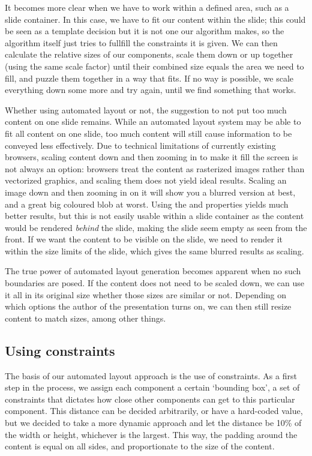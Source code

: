    It becomes more clear when we have to work within a defined area, such as a
   slide container. In this case, we have to fit our content within the slide;
   this could be seen as a template decision but it is not one our algorithm
   makes, so the algorithm itself just tries to fullfill the constraints it is
   given. We can then calculate the relative sizes of our components, scale
   them down or up together (using the same scale factor) until their combined
   size equals the area we need to fill, and puzzle them together in a way that
   fits. If no way is possible, we scale everything down some more and try
   again, until we find something that works.

   Whether using automated layout or not, the suggestion to not put too much
   content on one slide remains. While an automated layout system may be able
   to fit all content on one slide, too much content will still cause
   information to be conveyed less effectively. Due to technical limitations of
   currently existing browsers, scaling content down and then zooming in to
   make it fill the screen is not always an option: browsers treat the content
   as rasterized images rather than vectorized graphics, and scaling them does
   not yield ideal results. Scaling an image down and then zooming in on it
   will show you a blurred version at best, and a great big coloured blob at
   worst. Using the  and  properties
   yields much better results, but this is not easily usable within a slide
   container as the content would be rendered \emph{behind} the slide, making
   the slide seem empty as seen from the front. If we want the content to be
   visible on the slide, we need to render it within the size limits of the
   slide, which gives the same blurred results as scaling.

   The true power of automated layout generation becomes apparent when no such
   boundaries are posed. If the content does not need to be scaled down, we can
   use it all in its original size whether those sizes are similar or not.
   Depending on which options the author of the presentation turns on, we can
   then still resize content to match sizes, among other things.

   \subsection{Using constraints}

    The basis of our automated layout approach is the use of constraints. As a
    first step in the process, we assign each component a certain `bounding
    box', a set of constraints that dictates how close other components can get
    to this particular component. This distance can be decided arbitrarily, or
    have a hard-coded value, but we decided to take a more dynamic approach and
    let the distance be 10\% of the width or height, whichever is the largest.
    This way, the padding around the content is equal on all sides, and
    proportionate to the size of the content.


